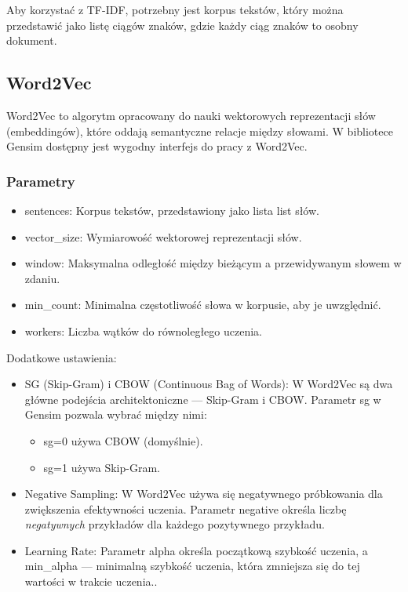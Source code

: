 			Aby korzystać z TF-IDF, potrzebny jest korpus tekstów, który można przedstawić jako listę ciągów znaków, gdzie każdy ciąg znaków to osobny dokument.
			
 
	\subsection{Word2Vec}
		Word2Vec to algorytm opracowany do nauki wektorowych reprezentacji słów (embeddingów), które oddają semantyczne relacje między słowami. W bibliotece Gensim dostępny jest wygodny interfejs do pracy z Word2Vec. \cite{word2vec}


		\subsubsection{Parametry}	
			\begin{itemize}
				\item sentences: Korpus tekstów, przedstawiony jako lista list słów.
				\item vector\_size: Wymiarowość wektorowej reprezentacji słów.
				\item window: Maksymalna odległość między bieżącym a przewidywanym słowem w zdaniu.
				\item min\_count: Minimalna częstotliwość słowa w korpusie, aby je uwzględnić.
				\item workers: Liczba wątków do równoległego uczenia.
			\end{itemize}
		
			Dodatkowe ustawienia:
			\begin{itemize}
				\item SG (Skip-Gram) i CBOW (Continuous Bag of Words): W Word2Vec są dwa główne podejścia architektoniczne — Skip-Gram i CBOW. Parametr sg w Gensim pozwala wybrać między nimi:
					\begin{itemize}
						\item sg=0 używa CBOW (domyślnie).
						\item sg=1 używa Skip-Gram.
					\end{itemize}
				\item Negative Sampling: W Word2Vec używa się negatywnego próbkowania dla zwiększenia efektywności uczenia. Parametr negative określa liczbę \textit{negatywnych} przykładów dla każdego pozytywnego przykładu.
				\item Learning Rate: Parametr alpha określa początkową szybkość uczenia, a min\_alpha — minimalną szybkość uczenia, która zmniejsza się do tej wartości w trakcie uczenia..
			\end{itemize}
		
